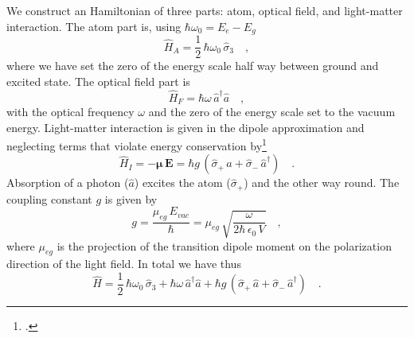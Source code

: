 We construct an Hamiltonian of three parts:  atom, optical field, and light-matter interaction. The atom part is, using $\hbar \omega_0 = E_e - E_g$ 
\begin{equation}
\hat{H}_A = \frac{1}{2} \, \hbar \omega_0 \, \hat{\sigma}_3 \quad ,
\end{equation}
where we have set the zero of the energy scale half way between ground and excited state. The optical field part is
\begin{equation}
\hat{H}_F = \hbar \omega \, \hat{a}^\dagger  \hat{a} \quad ,
\end{equation}
with the optical frequency $\omega$ and the zero of the energy scale set to the vacuum energy. Light-matter interaction is given in the dipole approximation and neglecting terms that violate energy conservation by\footcite[chap. 6.7.1]{Rand2016}
\begin{equation}
\hat{H}_I = - \boldsymbol{\mu} \, \boldsymbol{E} =
 \hbar g \, (\hat{\sigma}_+ \, \hat{a} + \hat{\sigma}_- \,\hat{a}^\dagger )  \quad .
\end{equation}
Absorption of a photon ($\hat{a}$) excites the atom ($\hat{\sigma}_+$) and the other way round.
The coupling constant $g$ is given by
\begin{equation}
 g = \frac{\mu_{eg} \, E_{vac} }{\hbar}
 =
  \mu_{eg} \, \sqrt{\frac{\omega}{2 \hbar \, \epsilon_0 \, V}}  \quad ,
\end{equation}
where $\mu_{eg} $ is the projection of the transition dipole moment on the polarization direction of the light field. In total we have thus
\begin{equation}
 \hat{H} = \frac{1}{2} \, \hbar \omega_0 \, \hat{\sigma}_3 
 +  \hbar \omega \, \hat{a}^\dagger \hat{a}
 + \hbar g \, (\hat{\sigma}_+ \, \hat{a} + \hat{\sigma}_- \,\hat{a}^\dagger )  \quad .
\end{equation}

